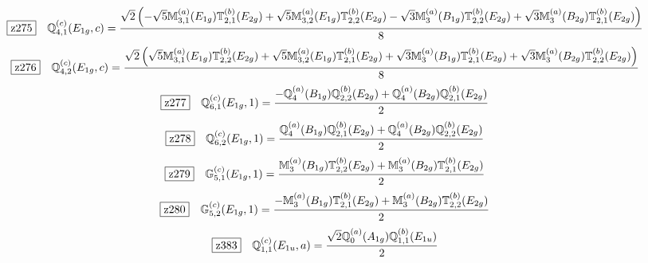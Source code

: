 \documentclass[fleqn,10pt,landscape]{jsarticle}
\begin{document}
\begin{dmath*}
\hspace*{3mm}\fbox{z275}\quad \mathbb{Q}_{4,1}^{(c)}(E_{1g},c)=\frac{\sqrt{2} \left(- \sqrt{5} \mathbb{M}_{3,1}^{(a)}(E_{1g}) \mathbb{T}_{2,1}^{(b)}(E_{2g}) + \sqrt{5} \mathbb{M}_{3,2}^{(a)}(E_{1g}) \mathbb{T}_{2,2}^{(b)}(E_{2g}) - \sqrt{3} \mathbb{M}_{3}^{(a)}(B_{1g}) \mathbb{T}_{2,2}^{(b)}(E_{2g}) + \sqrt{3} \mathbb{M}_{3}^{(a)}(B_{2g}) \mathbb{T}_{2,1}^{(b)}(E_{2g})\right)}{8}
\end{dmath*}
\begin{dmath*}
\hspace*{3mm}\fbox{z276}\quad \mathbb{Q}_{4,2}^{(c)}(E_{1g},c)=\frac{\sqrt{2} \left(\sqrt{5} \mathbb{M}_{3,1}^{(a)}(E_{1g}) \mathbb{T}_{2,2}^{(b)}(E_{2g}) + \sqrt{5} \mathbb{M}_{3,2}^{(a)}(E_{1g}) \mathbb{T}_{2,1}^{(b)}(E_{2g}) + \sqrt{3} \mathbb{M}_{3}^{(a)}(B_{1g}) \mathbb{T}_{2,1}^{(b)}(E_{2g}) + \sqrt{3} \mathbb{M}_{3}^{(a)}(B_{2g}) \mathbb{T}_{2,2}^{(b)}(E_{2g})\right)}{8}
\end{dmath*}
\begin{dmath*}
\hspace*{3mm}\fbox{z277}\quad \mathbb{Q}_{6,1}^{(c)}(E_{1g},1)=\frac{- \mathbb{Q}_{4}^{(a)}(B_{1g}) \mathbb{Q}_{2,2}^{(b)}(E_{2g}) + \mathbb{Q}_{4}^{(a)}(B_{2g}) \mathbb{Q}_{2,1}^{(b)}(E_{2g})}{2}
\end{dmath*}
\begin{dmath*}
\hspace*{3mm}\fbox{z278}\quad \mathbb{Q}_{6,2}^{(c)}(E_{1g},1)=\frac{\mathbb{Q}_{4}^{(a)}(B_{1g}) \mathbb{Q}_{2,1}^{(b)}(E_{2g}) + \mathbb{Q}_{4}^{(a)}(B_{2g}) \mathbb{Q}_{2,2}^{(b)}(E_{2g})}{2}
\end{dmath*}
\begin{dmath*}
\hspace*{3mm}\fbox{z279}\quad \mathbb{G}_{5,1}^{(c)}(E_{1g},1)=\frac{\mathbb{M}_{3}^{(a)}(B_{1g}) \mathbb{T}_{2,2}^{(b)}(E_{2g}) + \mathbb{M}_{3}^{(a)}(B_{2g}) \mathbb{T}_{2,1}^{(b)}(E_{2g})}{2}
\end{dmath*}
\begin{dmath*}
\hspace*{3mm}\fbox{z280}\quad \mathbb{G}_{5,2}^{(c)}(E_{1g},1)=\frac{- \mathbb{M}_{3}^{(a)}(B_{1g}) \mathbb{T}_{2,1}^{(b)}(E_{2g}) + \mathbb{M}_{3}^{(a)}(B_{2g}) \mathbb{T}_{2,2}^{(b)}(E_{2g})}{2}
\end{dmath*}
\begin{dmath*}
\hspace*{3mm}\fbox{z383}\quad \mathbb{Q}_{1,1}^{(c)}(E_{1u},a)=\frac{\sqrt{2} \mathbb{Q}_{0}^{(a)}(A_{1g}) \mathbb{Q}_{1,1}^{(b)}(E_{1u})}{2}
\end{dmath*}
\end{document}
